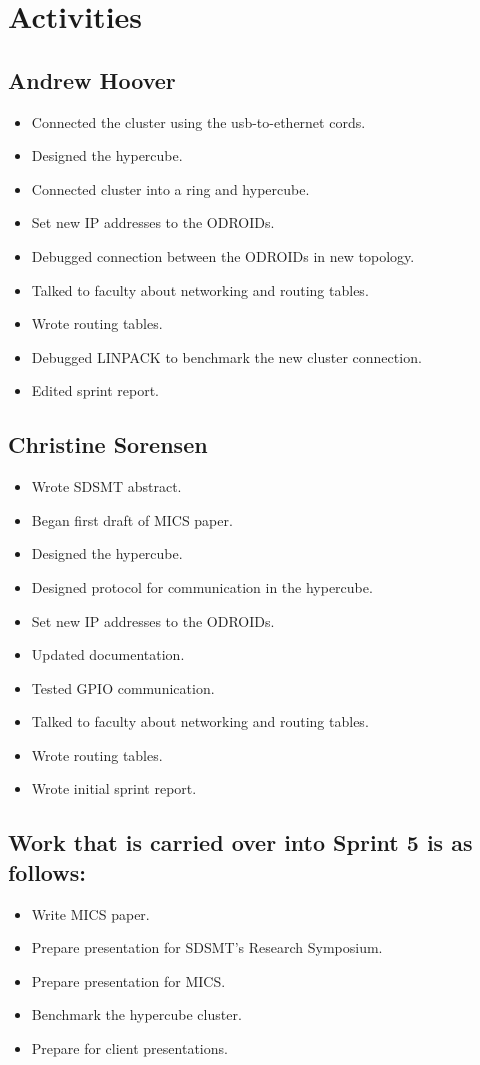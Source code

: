 \documentclass{article}
\begin{document}
\section*{Activities}

\subsection*{Andrew Hoover}
\begin{itemize}
	\item Connected the cluster using the usb-to-ethernet cords.
	\item Designed the hypercube.
	\item Connected cluster into a ring and hypercube.
	\item Set new IP addresses to the ODROIDs.
	\item Debugged connection between the ODROIDs in new topology.
	\item Talked to faculty about networking and routing tables.
	\item Wrote routing tables.
	\item Debugged LINPACK to benchmark the new cluster connection.
	\item Edited sprint report.
\end{itemize}
\subsection*{Christine Sorensen}
\begin{itemize}
	\item Wrote SDSMT abstract.
	\item Began first draft of MICS paper.
	\item Designed the hypercube.
	\item Designed protocol for communication in the hypercube.
	\item Set new IP addresses to the ODROIDs.
	\item Updated documentation.
	\item Tested GPIO communication.
	\item Talked to faculty about networking and routing tables.
	\item Wrote routing tables.	
	\item Wrote initial sprint report.
\end{itemize}

\subsection*{Work that is carried over into Sprint 5 is as follows:}
\begin{itemize}
	\item Write MICS paper.
	\item Prepare presentation for SDSMT's Research Symposium.
	\item Prepare presentation for MICS.
	\item Benchmark the hypercube cluster.
	\item Prepare for client presentations.
\end{itemize}
\end{document}
